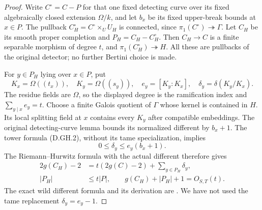 \begin{proof}
Write \(C^\circ=C-P\) for that one fixed detecting
curve over its fixed algebraically closed extension
\(\Omega/k\), and let \(b_x\) be its fixed upper-break
bounds at \(x\in P\).
The pullback \(C_H^\circ=C^\circ\times_U U_H\)
is connected, since
\(\pi_1(C^\circ)\twoheadrightarrow\Gamma\).
Let \(C_H\) be its smooth proper completion and
\(P_H=C_H-C_H^\circ\). Then \(C_H\to C\) is a
finite separable morphism of degree \(t\), and
\(\pi_1(C_H^\circ)\twoheadrightarrow H\).
All these are pullbacks of the original detector;
no further Bertini choice is made.

For \(y\in P_H\) lying over \(x\in P\), put
\[
 K_x=\Omega((t_x)),\quad K_y=\Omega((s_y)),\quad
 e_y=[K_y:K_x],\quad \delta_y=\delta(K_y/K_x).
                                                        \tag{D.GH.15}
\]
The residue fields are \(\Omega\), so the displayed
degree is the ramification index and
\(\sum_{y\mid x}e_y=t\).
Choose a finite Galois quotient of \(\Gamma\) whose
kernel is contained in \(H\). Its local splitting
field at \(x\) contains every \(K_y\) after compatible
embeddings. The original detecting-curve lemma bounds
its normalized different by \(b_x+1\).
The tower formula (D.GH.2), without its tame
specialization, implies
\[
             0\le\delta_y\le e_y(b_x+1).
                                                        \tag{D.GH.16}
\]
The Riemann--Hurwitz formula with the actual different
therefore gives
\[
 \begin{aligned}
 2g(C_H)-2
   &=t(2g(C)-2)+\sum_{y\in P_H}\delta_y,\\
 |P_H|&\le t|P|,\qquad g(C_H)+|P_H|+1=O_{S,T}(t).
 \end{aligned}                                         \tag{D.GH.17}
\]
The exact wild different formula and its derivation
are \citet[Section 53.12 and Lemma 53.12.2,
Tag 0C1B]{StacksResidualGenusB}. We have not used the
tame replacement \(\delta_y=e_y-1\).


\end{proof}
